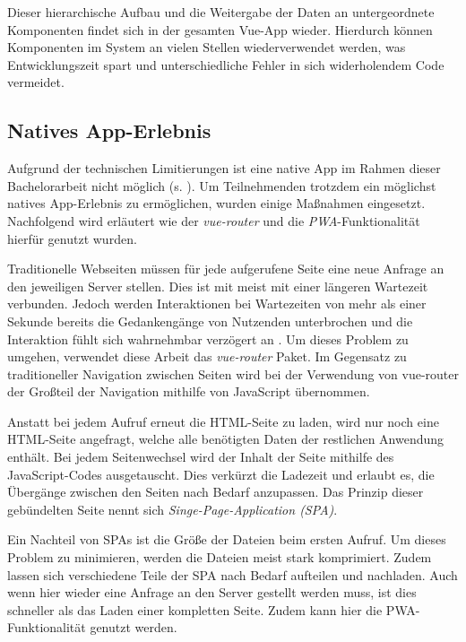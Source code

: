 Dieser hierarchische Aufbau und die Weitergabe der Daten an untergeordnete
Komponenten findet sich in der gesamten Vue-App wieder. Hierdurch können
Komponenten im System an vielen Stellen wiederverwendet werden, was
Entwicklungszeit spart und unterschiedliche Fehler in sich widerholendem Code
vermeidet.

\subsection{Natives App-Erlebnis}

Aufgrund der technischen Limitierungen ist eine native App im Rahmen dieser
Bachelorarbeit nicht möglich (s. ). Um
Teilnehmenden trotzdem ein möglichst natives App-Erlebnis zu ermöglichen, wurden
einige Maßnahmen eingesetzt. Nachfolgend wird erläutert wie der
\textit{vue-router} und die \textit{PWA}-Funktionalität hierfür genutzt wurden.

Traditionelle Webseiten müssen für jede aufgerufene Seite eine neue Anfrage an
den jeweiligen Server stellen. Dies ist mit meist mit einer längeren Wartezeit
verbunden. Jedoch werden Interaktionen bei Wartezeiten von mehr als einer
Sekunde bereits die Gedankengänge von Nutzenden unterbrochen und die Interaktion
fühlt sich wahrnehmbar verzögert an \cite{Nielsen1994b}. Um dieses Problem zu
umgehen, verwendet diese Arbeit das \textit{vue-router} Paket. Im Gegensatz zu
traditioneller Navigation zwischen Seiten wird bei der Verwendung von vue-router
der Großteil der Navigation mithilfe von JavaScript übernommen.

Anstatt bei jedem Aufruf erneut die HTML-Seite zu laden, wird nur noch eine
HTML-Seite angefragt, welche alle benötigten Daten der restlichen Anwendung
enthält. Bei jedem Seitenwechsel wird der Inhalt der Seite mithilfe des
JavaScript-Codes ausgetauscht. Dies verkürzt die Ladezeit und erlaubt es, die
Übergänge zwischen den Seiten nach Bedarf anzupassen. Das Prinzip dieser
gebündelten Seite nennt sich \textit{Singe-Page-Application (SPA)}.

Ein Nachteil von SPAs ist die Größe der Dateien beim ersten Aufruf. Um dieses
Problem zu minimieren, werden die Dateien meist stark komprimiert. Zudem lassen
sich verschiedene Teile der SPA nach Bedarf aufteilen und nachladen. Auch wenn
hier wieder eine Anfrage an den Server gestellt werden muss, ist dies schneller
als das Laden einer kompletten Seite. Zudem kann hier die PWA-Funktionalität
genutzt werden.


